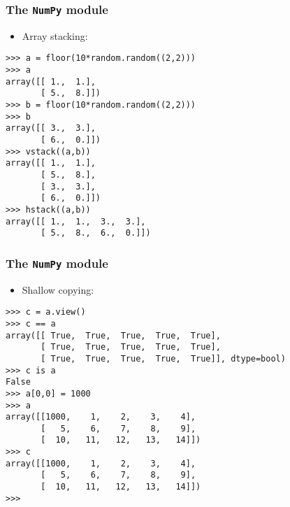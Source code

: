 \documentclass[handout]{beamer}
\numberwithin{equation}{section}
\begin{document}
\begin{frame}[fragile]
\frametitle{The {\tt NumPy} module}

\begin{itemize}
\item Array stacking:
\end{itemize}

\begin{lstlisting}[name=ex2]
>>> a = floor(10*random.random((2,2)))
>>> a
array([[ 1.,  1.],
       [ 5.,  8.]])
>>> b = floor(10*random.random((2,2)))
>>> b
array([[ 3.,  3.],
       [ 6.,  0.]])
>>> vstack((a,b))
array([[ 1.,  1.],
       [ 5.,  8.],
       [ 3.,  3.],
       [ 6.,  0.]])
>>> hstack((a,b))
array([[ 1.,  1.,  3.,  3.],
       [ 5.,  8.,  6.,  0.]])
\end{lstlisting}
\end{frame}


\begin{frame}[fragile]
\frametitle{The {\tt NumPy} module}

\begin{itemize}
\item Shallow copying:
\end{itemize}

\begin{lstlisting}[name=ex2]
>>> c = a.view()
>>> c == a
array([[ True,  True,  True,  True,  True],
       [ True,  True,  True,  True,  True],
       [ True,  True,  True,  True,  True]], dtype=bool)
>>> c is a
False
>>> a[0,0] = 1000
>>> a
array([[1000,    1,    2,    3,    4],
       [   5,    6,    7,    8,    9],
       [  10,   11,   12,   13,   14]])
>>> c
array([[1000,    1,    2,    3,    4],
       [   5,    6,    7,    8,    9],
       [  10,   11,   12,   13,   14]])
>>> 
\end{lstlisting}
\end{frame}
\end{document}
